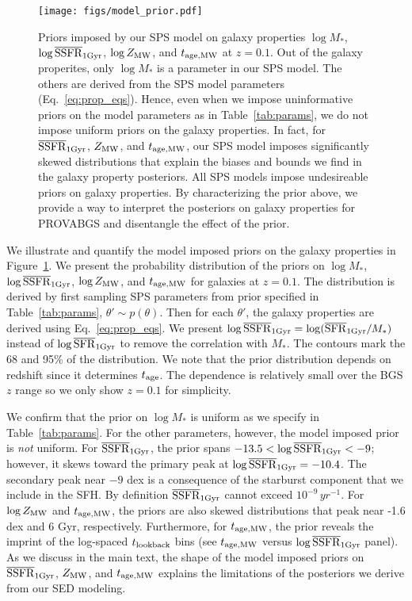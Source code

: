 \begin{figure}
\begin{center}
\texttt{[image: figs/model\_prior.pdf]}
    \caption{
    Priors imposed by our SPS model on galaxy properties $\log M_*$, $\log
    \overline{\rm SSFR}_{\rm 1 Gyr}$, $\log Z_{\rm MW}$, and $t_{\rm age, MW}$ at
    $z=0.1$. 
    Out of the galaxy properites, only $\log M_*$ is a parameter in our SPS
    model.
    The others are derived from the SPS model parameters
    (Eq.~\ref{eq:prop_eqs}). 
    Hence, even when we impose uninformative priors on the model parameters as
    in Table~\ref{tab:params}, we do not impose uniform priors on the galaxy
    properties. 
    In fact, for $\overline{\rm SSFR}_{\rm 1Gyr}$, $Z_{\rm MW}$, and $t_{\rm age, MW}$, our SPS model imposes
    significantly skewed distributions that explain the biases and bounds we
    find in the galaxy property posteriors.  
    All SPS models impose undesireable priors on galaxy properties. 
    By characterizing the prior above, we provide a way to interpret the
    posteriors on galaxy properties for PROVABGS and disentangle the effect of
    the prior. 
    }\label{fig:model_prior}
\end{center}
\end{figure}
We illustrate and quantify the model imposed priors on the galaxy
properties in Figure~\ref{fig:model_prior}. 
We present the probability distribution of the priors on $\log M_*$,
$\log\overline{\rm SSFR}_{\rm 1Gyr}$, $\log Z_{\rm MW}$, and $t_{\rm age, MW}$ for galaxies at $z=0.1$.
The distribution is derived by first sampling SPS parameters from prior
specified in Table~\ref{tab:params}, $\theta'\sim p(\theta)$.
Then for each $\theta'$, the galaxy properties are derived using
Eq.~\ref{eq:prop_eqs}. 
We present $\log\overline{\rm SSFR}_{\rm 1Gyr} = \log(\overline{\rm SFR}_{\rm 1Gyr}/M_*)$ instead of $\log\overline{\rm SFR}_{\rm 1Gyr}$ to
remove the correlation with $M_*$.  
The contours mark the 68 and 95\% of the distribution. 
We note that the prior distribution depends on redshift since it determines
$t_{\rm age}$.
The dependence is relatively small over the BGS $z$ range so we only show
$z=0.1$ for simplicity. 

We confirm that the prior on $\log M_*$ is uniform as we specify in
Table~\ref{tab:params}. 
For the other parameters, however, the model imposed prior is \emph{not}
uniform. 
For $\overline{\rm SSFR}_{\rm 1Gyr}$, the prior spans $-13.5 < \log \overline{\rm SSFR}_{\rm 1Gyr} < -9$; however, it skews
toward the primary peak at $\log\overline{\rm SSFR}_{\rm 1Gyr} = -10.4$. 
The secondary peak near $-9$ dex is a consequence of the starburst component that
we include in the SFH. 
By definition $\overline{\rm SSFR}_{\rm 1Gyr}$ cannot exceed $10^{-9}\,yr^{-1}$. 
For $\log Z_{\rm MW}$ and $t_{\rm age, MW}$, the priors are also skewed distributions that peak
near -1.6 dex and 6 Gyr, respectively.
Furthermore, for $t_{\rm age, MW}$, the prior reveals the imprint of the log-spaced 
$t_{\rm lookback}$ bins (see $t_{\rm age, MW}$ versus $\log\overline{\rm SSFR}_{\rm 1Gyr}$ panel).
As we discuss in the main text, the shape of the model imposed priors on
$\overline{\rm SSFR}_{\rm 1Gyr}$, $Z_{\rm MW}$, and $t_{\rm age, MW}$ explains the limitations of the posteriors we
derive from our SED modeling.


